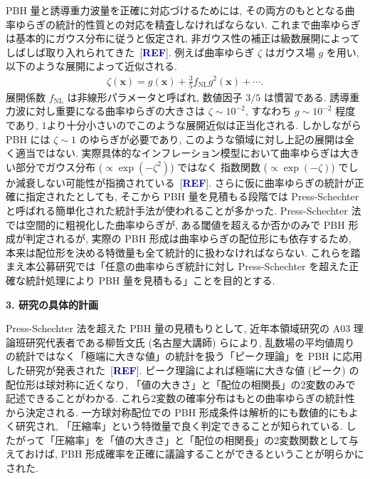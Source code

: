 \documentclass[11pt,a4paper,uplatex,dvipdfmx]{ujarticle} 		%
\newcommand{\研究課題名}{曲率ゆらぎの統計と原始ブラックホール量の精密対応}
\newcommand{\研究機関名}{名古屋大学}
\newcommand{\研究代表者氏名}{多田祐一郎}
\newcommand{\研究期間の最終元号年度}{4}  %
\newcommand{\fNL}{f_\mathrm{NL}}
\newcommand{\bae}[1]{\begin{align} #1 \end{align}}
\newcommand{\bfx}{\mathbf{x}}
\newcommand{\Blue}[1]{\textcolor{darkblue}{\sffamily\gtfamily\bfseries #1}}
\begin{document}
PBH 量と誘導重力波量を正確に対応づけるためには, その両方のもととなる曲率ゆらぎの統計的性質との対応を精査しなければならない.
これまで曲率ゆらぎは基本的にガウス分布に従うと仮定され, 非ガウス性の補正は級数展開によってしばしば取り入れられてきた~[\Blue{REF}].
例えば曲率ゆらぎ $\zeta$ はガウス場 $g$ を用い, 以下のような展開によって近似される.
\bae{\label{eq: fNL expansion}
	\zeta(\bfx)=g(\bfx)+\frac{3}{5}\fNL g^2(\bfx)+\cdots.
}
展開係数 $\fNL$ は非線形パラメータと呼ばれ, 数値因子 $3/5$ は慣習である.
誘導重力波に対し重要になる曲率ゆらぎの大きさは $\zeta\sim10^{-2}$, すなわち $g\sim10^{-2}$ 程度であり, $1$より十分小さいのでこのような展開近似は正当化される.
しかしながら PBH には $\zeta\sim1$ のゆらぎが必要であり, このような領域に対し上記の展開は全く適当ではない.
実際具体的なインフレーション模型において曲率ゆらぎは大きい部分でガウス分布 ($\propto\exp(-\zeta^2)$) ではなく
指数関数 ($\propto\exp(-\zeta)$) でしか減衰しない可能性が指摘されている~[\Blue{REF}].
さらに仮に曲率ゆらぎの統計が正確に指定されたとしても, そこから PBH 量を見積もる段階では Press-Schechter と呼ばれる簡単化された統計手法が使われることが多かった.
Press-Schechter 法では空間的に粗視化した曲率ゆらぎが, ある閾値を超えるか否かのみで PBH 形成が判定されるが,
実際の PBH 形成は曲率ゆらぎの配位形にも依存するため, 本来は配位形を決める特徴量も全て統計的に扱わなければならない.
これらを踏まえ本公募研究では「任意の曲率ゆらぎ統計に対し Press-Schechter を超えた正確な統計処理により PBH 量を見積もる」ことを目的とする.


\begin{mdframed}[roundcorner=0.5zw,
	innertopmargin=0.8zw,innerbottommargin=0.8zw,
	linecolor=black!50,linewidth=0.2zw,
	backgroundcolor=black!10]
	{\bfseries\gtfamily\sffamily\large 3. 研究の具体的計画}
\end{mdframed}

\noindent
Press-Schechter 法を超えた PBH 量の見積もりとして, 近年本領域研究の A03 理論班研究代表者である柳哲文氏 (名古屋大講師) らにより,
乱数場の平均値周りの統計ではなく「極端に大きな値」の統計を扱う「ピーク理論」を PBH に応用した研究が発表された~[\Blue{REF}].
ピーク理論によれば極端に大きな値 (ピーク) の配位形は球対称に近くなり, 「値の大きさ」と「配位の相関長」の2変数のみで記述できることがわかる.
これら2変数の確率分布はもとの曲率ゆらぎの統計性から決定される.
一方球対称配位での PBH 形成条件は解析的にも数値的にもよく研究され, 「圧縮率」という特徴量で良く判定できることが知られている.
したがって「圧縮率」を「値の大きさ」と「配位の相関長」の2変数関数として与えておけば, 
PBH 形成確率を正確に議論することができるということが明らかにされた.
\end{document}
